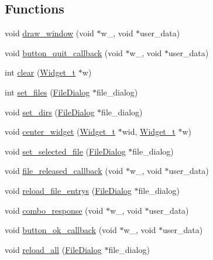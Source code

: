 \subsection*{Functions}
\begin{DoxyCompactItemize}
\item 
void \hyperlink{xfile-dialog_8c_ab1219e8c5af9084d5c2846d6d5b31f09}{draw\+\_\+window} (void $\ast$w\+\_\+, void $\ast$user\+\_\+data)
\item 
void \hyperlink{xfile-dialog_8c_a29da3eb623588f5844adaa40bf0f2c6f}{button\+\_\+quit\+\_\+callback} (void $\ast$w\+\_\+, void $\ast$user\+\_\+data)
\item 
int \hyperlink{xfile-dialog_8c_a3a8abfa9334fe02a8ea868b9eb014767}{clear} (\hyperlink{structWidget__t}{Widget\+\_\+t} $\ast$w)
\item 
int \hyperlink{xfile-dialog_8c_a7e6e557ac793b1c7a44df0d7917a5a4c}{set\+\_\+files} (\hyperlink{structFileDialog}{File\+Dialog} $\ast$file\+\_\+dialog)
\item 
void \hyperlink{xfile-dialog_8c_a129ae2b7a76afe92cef3da6275c61705}{set\+\_\+dirs} (\hyperlink{structFileDialog}{File\+Dialog} $\ast$file\+\_\+dialog)
\item 
void \hyperlink{xfile-dialog_8c_a046328a2cdd03a86fff0e8d92fc48a36}{center\+\_\+widget} (\hyperlink{structWidget__t}{Widget\+\_\+t} $\ast$wid, \hyperlink{structWidget__t}{Widget\+\_\+t} $\ast$w)
\item 
void \hyperlink{xfile-dialog_8c_a1f8b18285d9b4b0b04a146801c6da011}{set\+\_\+selected\+\_\+file} (\hyperlink{structFileDialog}{File\+Dialog} $\ast$file\+\_\+dialog)
\item 
void \hyperlink{xfile-dialog_8c_a64c3c7944341f7cf28d663cce00399a7}{file\+\_\+released\+\_\+callback} (void $\ast$w\+\_\+, void $\ast$user\+\_\+data)
\item 
void \hyperlink{xfile-dialog_8c_ad0362abb358fc6b16f5a8b3db022cd57}{reload\+\_\+file\+\_\+entrys} (\hyperlink{structFileDialog}{File\+Dialog} $\ast$file\+\_\+dialog)
\item 
void \hyperlink{xfile-dialog_8c_ade5a2bc859e5d9a498edf28ee32526b8}{combo\+\_\+response} (void $\ast$w\+\_\+, void $\ast$user\+\_\+data)
\item 
void \hyperlink{xfile-dialog_8c_a71fb562e126b4b9ce816344b87564257}{button\+\_\+ok\+\_\+callback} (void $\ast$w\+\_\+, void $\ast$user\+\_\+data)
\item 
void \hyperlink{xfile-dialog_8c_ad0abc7fe3e910dc3b819722fc6e76631}{reload\+\_\+all} (\hyperlink{structFileDialog}{File\+Dialog} $\ast$file\+\_\+dialog)

\end{DoxyCompactItemize}

